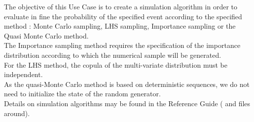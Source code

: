 \renewcommand{\filename}{docUC_ThresholdExceedance_SimulationAlgorithm.tex}
\renewcommand{\filetitle}{UC : Creation of a Monte Carlo / LHS / Quasi Monte Carlo / Importance Sampling simulation algorithm}

\HeaderIIILevel


\label{simuAlgo}






The objective of this Use Case is to create a simulation algorithm in order to evaluate in fine the probability of the specified event according to the specified method : Monte Carlo sampling, LHS sampling, Importance sampling or the Quasi Monte Carlo method.\\

The Importance sampling method requires the specification of the importance distribution according to which the numerical sample will be generated.\\

For the LHS method, the copula of the multi-variate distribution must be independent.\\

As the quasi-Monte Carlo method is based on deterministic sequences, we do not need to initialize the state of the random generator.\\



Details on simulation algorithms may be found in the Reference Guide ( and files around).\\



